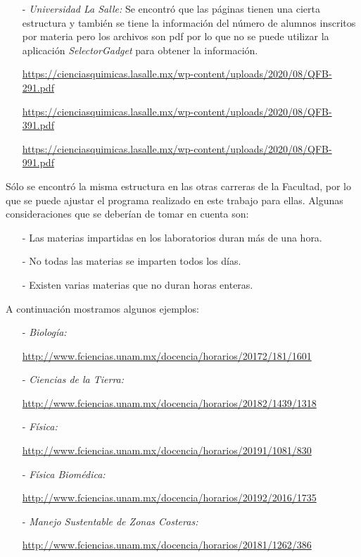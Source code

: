 \begin{itemize}
\item[-] \textit{Universidad La Salle:} Se encontró que las páginas tienen una cierta estructura y también se tiene la información del número de alumnos inscritos por materia pero los archivos son pdf por lo que no se puede utilizar la aplicación \textit{SelectorGadget} para obtener la información.

\url{https://cienciasquimicas.lasalle.mx/wp-content/uploads/2020/08/QFB-291.pdf}

\url{https://cienciasquimicas.lasalle.mx/wp-content/uploads/2020/08/QFB-391.pdf}

\url{https://cienciasquimicas.lasalle.mx/wp-content/uploads/2020/08/QFB-991.pdf}


%
%

\end{itemize}

Sólo se encontró la misma estructura en las otras carreras de la Facultad, por lo que se puede ajustar el programa realizado en este trabajo para ellas. Algunas consideraciones que se deberían de tomar en cuenta son:

\begin{itemize}
\item[-] Las materias impartidas en los laboratorios duran más de una hora.

\item[-] No todas las materias se imparten todos los días.

\item[-] Existen varias materias que no duran horas enteras.
\end{itemize}

A continuación mostramos algunos ejemplos:

\begin{itemize}
\item[-] \textit{Biología:}

\url{http://www.fciencias.unam.mx/docencia/horarios/20172/181/1601}

\item[-] \textit{Ciencias de la Tierra:}

\url{http://www.fciencias.unam.mx/docencia/horarios/20182/1439/1318}

\item[-] \textit{Física:}

\url{http://www.fciencias.unam.mx/docencia/horarios/20191/1081/830}

\item[-] \textit{Física Biomédica:}

\url{http://www.fciencias.unam.mx/docencia/horarios/20192/2016/1735}

\item[-] \textit{Manejo Sustentable de Zonas Costeras:}

\url{http://www.fciencias.unam.mx/docencia/horarios/20181/1262/386}

\end{itemize}

